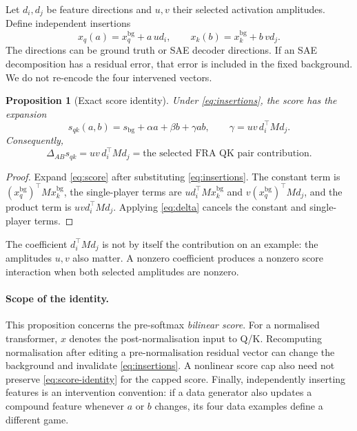 \documentclass[11pt]{article}
\newcommand{\pairdiff}{\Delta_{AB}}
\theoremstyle{plain}
\newtheorem{proposition}{Proposition}
\theoremstyle{definition}
\theoremstyle{remark}
\begin{document}
Let $d_i,d_j$ be feature directions and $u,v$ their selected activation amplitudes. Define independent insertions
\begin{equation}
 x_q(a)=x_q^{\mathrm{bg}}+a\,u d_i,
 \qquad
 x_k(b)=x_k^{\mathrm{bg}}+b\,v d_j.
\label{eq:insertions}
\end{equation}
The directions can be ground truth or SAE decoder directions. If an SAE decomposition has a residual error, that error is included in the fixed background. We do not re-encode the four intervened vectors.

\begin{proposition}[Exact score identity]\label{prop:score}
Under \cref{eq:insertions}, the score has the expansion
\begin{equation}
 s_{qk}(a,b)=s_{\mathrm{bg}}+\alpha a+\beta b+\gamma ab,
 \qquad
 \gamma=uv\,d_i^\top M d_j.
\label{eq:score-expansion}
\end{equation}
Consequently,
\begin{equation}
 \boxed{\pairdiff s_{qk}=uv\,d_i^\top M d_j
       =\text{the selected FRA QK pair contribution}.}
\label{eq:score-identity}
\end{equation}
\end{proposition}
\begin{proof}
Expand \cref{eq:score} after substituting \cref{eq:insertions}. The constant term is $(x_q^{\mathrm{bg}})^\top Mx_k^{\mathrm{bg}}$, the single-player terms are $u d_i^\top Mx_k^{\mathrm{bg}}$ and $v(x_q^{\mathrm{bg}})^\top Md_j$, and the product term is $uv d_i^\top Md_j$. Applying \cref{eq:delta} cancels the constant and single-player terms.
\end{proof}

The coefficient $d_i^\top Md_j$ is not by itself the contribution on an example: the amplitudes $u,v$ also matter. A nonzero coefficient produces a nonzero score interaction when both selected amplitudes are nonzero.

\paragraph{Scope of the identity.}
This proposition concerns the pre-softmax \emph{bilinear score}. For a normalised transformer, $x$ denotes the post-normalisation input to Q/K. Recomputing normalisation after editing a pre-normalisation residual vector can change the background and invalidate \cref{eq:insertions}. A nonlinear score cap also need not preserve \cref{eq:score-identity} for the capped score. Finally, independently inserting features is an intervention convention: if a data generator also updates a compound feature whenever $a$ or $b$ changes, its four data examples define a different game.
\end{document}
